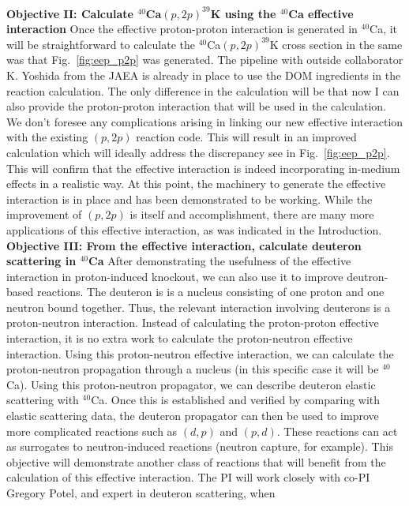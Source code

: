 \documentclass[12pt]{article}
\begin{document}
\\
\textbf{Objective II: Calculate $^{40}$Ca$(p,2p)^{39}$K using the $^{40}$Ca effective interaction}
Once the effective proton-proton interaction is generated in $^{40}$Ca, it will be straightforward to calculate the $^{40}$Ca$(p,2p)^{39}$K cross section in the same was that
Fig.~\ref{fig:eep_p2p} was generated. The pipeline with outside collaborator K. Yoshida from the JAEA is already in place to use the DOM ingredients in the reaction calculation.
The only difference in the calculation will be that now I can also provide the proton-proton interaction that will be used in the calculation. We don't foresee any complications
arising in linking our new effective interaction with the existing $(p,2p)$ reaction code. This will result in an improved calculation which will ideally address the discrepancy
see in Fig.~\ref{fig:eep_p2p}. This will confirm that the effective interaction is indeed incorporating in-medium effects in a realistic way. At this point, the machinery to
generate the effective interaction is in place and has been demonstrated to be working. While the improvement of $(p,2p)$ is itself and accomplishment, there are many more
applications of this effective interaction, as was indicated in the Introduction.
\\
\textbf{Objective III: From the effective interaction, calculate deuteron scattering in $^{40}$Ca}
After demonstrating the usefulness of the effective interaction in proton-induced knockout, we can also use it to improve deutron-based reactions. The deuteron is is a nucleus
consisting of one proton and one neutron bound together. Thus, the relevant interaction involving deuterons is a proton-neutron interaction. Instead of calculating the
proton-proton effective interaction, it is no extra work to calculate the proton-neutron effective interaction. Using this proton-neutron effective interaction, we can calculate
the proton-neutron propagation through a nucleus (in this specific case it will be $^{40}$Ca). Using this proton-neutron propagator, we can describe deuteron elastic scattering
with $^{40}$Ca. Once this is established and verified by comparing with elastic scattering data, the deuteron propagator can then be used to improve more complicated reactions such
as $(d,p)$ and $(p,d)$. These reactions can act as surrogates to neutron-induced reactions (neutron capture, for example). This objective will demonstrate another class of
reactions that will benefit from the calculation of this effective interaction. The PI will work closely with co-PI Gregory Potel, and expert in deuteron scattering, when
\end{document}
